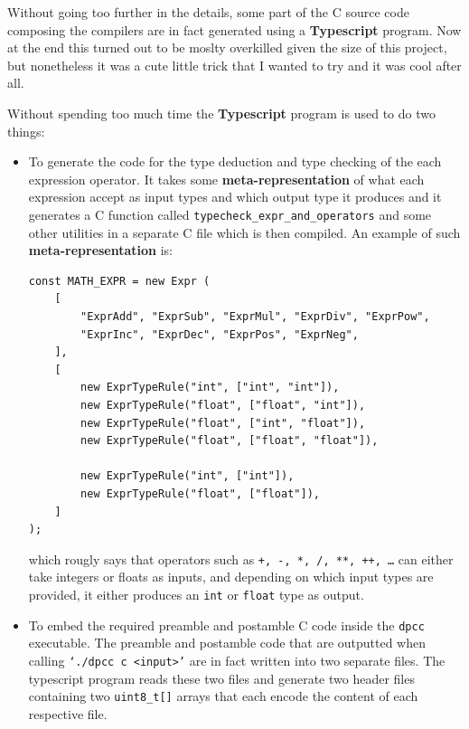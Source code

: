 \documentclass[a4paper]{article}
\begin{document}
Without going too further in the details, some part of the C source code composing the compilers are in fact
generated using a \textbf{Typescript} program. Now at the end this turned out to be moslty overkilled given
the size of this project, but nonetheless it was a cute little trick that I wanted to try and it was cool
after all.

Without spending too much time the \textbf{Typescript} program is used to do two things:

\begin{itemize}
    \item To generate the code for the type deduction and type checking of the each expression operator. It takes
        some \textbf{meta-representation} of what each expression accept as input types and which output type it produces
        and it generates a C function called \texttt{typecheck\_expr\_and\_operators} and some other utilities in a separate C file which is then compiled.
        An example of such \textbf{meta-representation} is:
        \begin{lstlisting}[language=JS]
const MATH_EXPR = new Expr (
    [
        "ExprAdd", "ExprSub", "ExprMul", "ExprDiv", "ExprPow",
        "ExprInc", "ExprDec", "ExprPos", "ExprNeg",
    ],
    [
        new ExprTypeRule("int", ["int", "int"]),
        new ExprTypeRule("float", ["float", "int"]),
        new ExprTypeRule("float", ["int", "float"]),
        new ExprTypeRule("float", ["float", "float"]),

        new ExprTypeRule("int", ["int"]),
        new ExprTypeRule("float", ["float"]),
    ]
);
        \end{lstlisting}

    which rougly says that operators such as \texttt{+, -, *, /, **, ++, \dots} can either take integers or floats as inputs,
    and depending on which input types are provided, it either produces an \texttt{int} or \texttt{float} type as output.

    \item To embed the required preamble and postamble C code inside the \texttt{dpcc} executable. The preamble and
        postamble code that are outputted when calling \texttt{`./dpcc c <input>'} are in fact written
        into two separate files. The typescript program reads these two files and generate two header files
        containing two \texttt{uint8\_t[]} arrays that each encode the content of each respective file.
\end{itemize}
\end{document}
